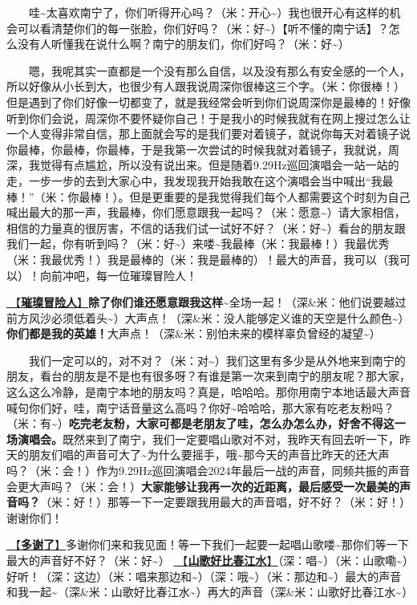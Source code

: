 \documentclass[]{ctexbook}
\begin{document}
  哇\textasciitilde 太喜欢南宁了，你们听得开心吗？（米：开心\textasciitilde）我也很开心有这样的机会可以看清楚你们的每一张脸，你们好吗？（米：好\textasciitilde）【听不懂的南宁话】？怎么没有人听懂我在说什么啊？南宁的朋友们，你们好吗？（米：好\textasciitilde）

  嗯，我呢其实一直都是一个没有那么自信，以及没有那么有安全感的一个人，所以好像从小长到大，也很少有人跟我说周深你很棒这三个字。（米：你很棒！）但是遇到了你们好像一切都变了，就是我经常会听到你们说周深你是最棒的！好像听到你们会说，周深你不要怀疑你自己！于是我小的时候我就有在网上搜过怎么让一个人变得非常自信，那上面就会写的是我们要对着镜子，就说你每天对着镜子说你最棒，你最棒，你最棒，于是我第一次尝试的时候我就对着镜子，我就说，周深，我觉得有点尴尬，所以没有说出来。但是随着9.29Hz巡回演唱会一站一站的走，一步一步的去到大家心中，我发现我开始我敢在这个演唱会当中喊出``我最棒！''（米：你最棒！）。但是更重要的是我觉得我们每个人都需要这个时刻为自己喊出最大的那一声，我最棒，你们愿意跟我一起吗？（米：愿意\textasciitilde）请大家相信，相信的力量真的很厉害，不信的话我们试一试好不好？（米：好\textasciitilde）看台的朋友跟我们一起，你有听到吗？（米：好\textasciitilde）来喽\textasciitilde 我最棒（米：我最棒！）我最优秀（米：我最优秀！）我是最棒的（米：我是最棒的）！最大的声音，我可以（我可以）！向前冲吧，每一位璀璨冒险人！

\hyperref[adventurers]{🎵【\textbf{璀璨冒险人}】}\textbf{除了你们谁还愿意跟我这样\textasciitilde{}}全场一起！（深\&米：他们说要越过前方风沙必须低着头\textasciitilde）大声点！（深\&米：没人能够定义谁的天空是什么颜色\textasciitilde）\textbf{你们都是我的英雄！}大声点！（深\&米：别怕未来的模样辜负曾经的凝望\textasciitilde）

  我们一定可以的，对不对？（米：对\textasciitilde）我们这里有多少是从外地来到南宁的朋友，看台的朋友是不是也有很多呀？有谁是第一次来到南宁的朋友呢？那大家，这么这么冷静，是南宁本地的朋友吗？真是，哈哈哈。那你用南宁本地话最大声音喊句你们好，哇，南宁话音量这么高吗？你好\textasciitilde 哈哈哈，那大家有吃老友粉吗？（米：有\textasciitilde）\textbf{吃完老友粉，大家可都是老朋友了哇，怎么办怎么办，好舍不得这一场演唱会。}既然来到了南宁，我们一定要唱山歌对不对，我昨天有回去听一下，昨天的朋友们唱的声音可大了\textasciitilde 为什么要摇手，哦\textasciitilde 那今天的声音比昨天的还大声吗？（米：会！）作为9.29Hz巡回演唱会2024年最后一战的声音，同频共振的声音会更大声吗？（米：会！）\textbf{大家能够让我再一次的近距离，最后感受一次最美的声音吗？}（米：好！）那等一下一定要跟我用最大的声音唱，好不好？（米：好！）谢谢你们！

\hyperref[folk-songs-like-spring-river]{🎵【\textbf{多谢了}】}多谢你们来和我见面！等一下我们一起要一起唱山歌喽\textasciitilde 那你们等一下最大的声音好不好？（米：好\textasciitilde）
\hyperref[folk-songs-like-spring-river]{🎵【\textbf{山歌好比春江水}】}（深：唱\textasciitilde）（米：山歌嘞\textasciitilde）好听！（深：这边）（米：唱来那边和\textasciitilde）（深：哦\textasciitilde）（米：那边和\textasciitilde）最大的声音和我一起\textasciitilde（深\&米：山歌好比春江水\textasciitilde）再大的声音（深\&米：山歌好比春江水\textasciitilde）
\end{document}
